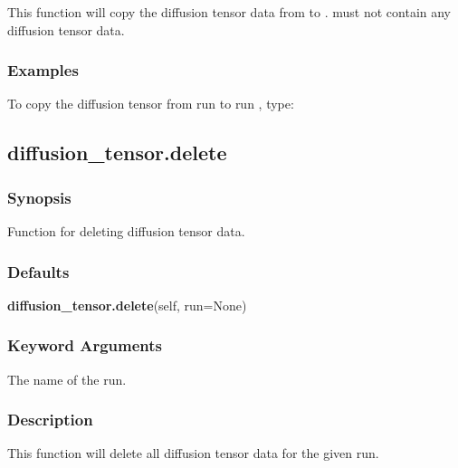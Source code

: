 This function will copy the diffusion tensor data from  to .   must not contain any diffusion tensor data.



\subsubsection{Examples}

To copy the diffusion tensor from run  to run , type:





\newpage

\subsection{diffusion\_tensor.delete}


\subsubsection{Synopsis}

Function for deleting diffusion tensor data.



\subsubsection{Defaults}

\textsf{\textbf{diffusion\_tensor.delete}(self, run=None)}


\subsubsection{Keyword Arguments}

  The name of the run. 




\subsubsection{Description}

This function will delete all diffusion tensor data for the given run.




\newpage

